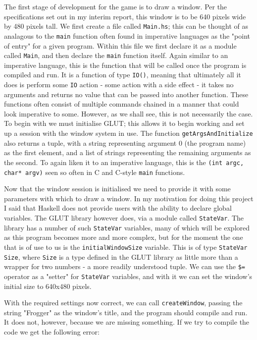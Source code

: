 \documentclass[12pt, a4paper]{report}
\begin{document}
The first stage of development for the game is to draw a window.
Per the specifications set out in my interim report, this window is to be 640 pixels wide by 480 pixels tall.
We first create a file called \verb|Main.hs|; this can be thought of as analagous to the \verb|main| function often found in imperative languages as the "point of entry" for a given program.
Within this file we first declare it as a module called \verb|Main|, and then declare the \verb|main| function itself.
Again similar to an imperative language, this is the function that will be called once the program is compiled and run.
It is a function of type \verb|IO()|, meaning that ultimately all it does is perform some \verb|IO| action - some action with a side effect - it takes no arguments and returns no value that can be passed into another function.
These functions often consist of multiple commands chained in a manner that could look imperative to some.
However, as we shall see, this is not necessarily the case.
To begin with we must initialise GLUT; this allows it to begin working and set up a session with the window system in use.
The function \verb|getArgsAndInitialize| also returns a tuple, with a string representing argument 0 (the program name) as the first element, and a list of strings representing the remaining arguments as the second.
To again liken it to an imperative language, this is the \verb|(int argc, char* argv)| seen so often in C and C-style \verb|main| functions.

\par

Now that the window session is initialised we need to provide it with some parameters with which to draw a window.
In my motivation for doing this project I said that Haskell does not provide users with the ability to declare global variables.
The GLUT library however does, via a module called \verb|StateVar|.
The library has a number of such \verb|StateVar| variables, many of which will be explored as this program becomes more and more complex, but for the moment the one that is of use to us is the \verb|initialWindowSize| variable.
This is of type \verb|StateVar Size|, where \verb|Size| is a type defined in the GLUT library as little more than a wrapper for two numbers - a more readily understood tuple.
We can use the \verb|$=| operator as a "setter" for \verb|StateVar| variables, and with it we can set the window's initial size to 640x480 pixels.

\par

With the required settings now correct, we can call \verb|createWindow|, passing the string "Frogger" as the window's title, and the program should compile and run.
It does not, however, because we are missing something.
If we try to compile the code we get the following error:
\end{document}
